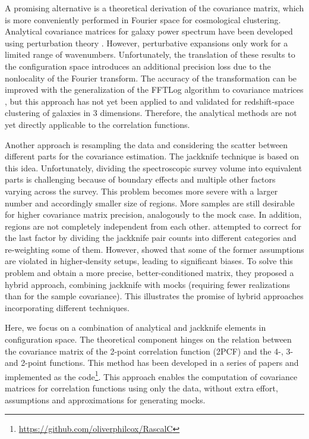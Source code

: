 A promising alternative is a theoretical derivation of the covariance matrix, which is more conveniently performed in Fourier space for cosmological clustering.
Analytical covariance matrices for galaxy power spectrum have been developed using perturbation theory \citep{CovaPT,PowerSpecCovFFT,KP4s8-Alves}.
However, perturbative expansions only work for a limited range of wavenumbers.
Unfortunately, the translation of these results to the configuration space introduces an additional precision loss due to the nonlocality of the Fourier transform.
The accuracy of the transformation can be improved with the generalization of the FFTLog algorithm to covariance matrices \citep{2D-FFTLog}, but this approach has not yet been applied to and validated for redshift-space clustering of galaxies in 3 dimensions.
Therefore, the analytical methods are not yet directly applicable to the correlation functions.

Another approach is resampling the data and considering the scatter between different parts for the covariance estimation.
The jackknife technique is based on this idea.
Unfortunately, dividing the spectroscopic survey volume into equivalent parts is challenging because of boundary effects and multiple other factors varying across the survey.
This problem becomes more severe with a larger number and accordingly smaller size of regions.
More samples are still desirable for higher covariance matrix precision, analogously to the mock case.
In addition, regions are not completely independent from each other.
\cite{MP21} attempted to correct for the last factor by dividing the jackknife pair counts into different categories and re-weighting some of them.
However, \cite{fitted-jk} showed that some of the former assumptions are violated in higher-density setups, leading to significant biases.
To solve this problem and obtain a more precise, better-conditioned matrix, they proposed a hybrid approach, combining jackknife with mocks (requiring fewer realizations than for the sample covariance).
This illustrates the promise of hybrid approaches incorporating different techniques.

Here, we focus on a combination of analytical and jackknife elements in configuration space.
The theoretical component hinges on the relation between the covariance matrix of the 2-point correlation function (2PCF) and the 4-, 3- and 2-point functions.
This method has been developed in a series of papers \citep{rascal,rascal-jackknife,rascalC,rascalC-legendre-3} and implemented as the \rascalc{} code\footnote{\url{https://github.com/oliverphilcox/RascalC}}.
This approach enables the computation of covariance matrices for correlation functions using only the data, without extra effort, assumptions and approximations for generating mocks.

